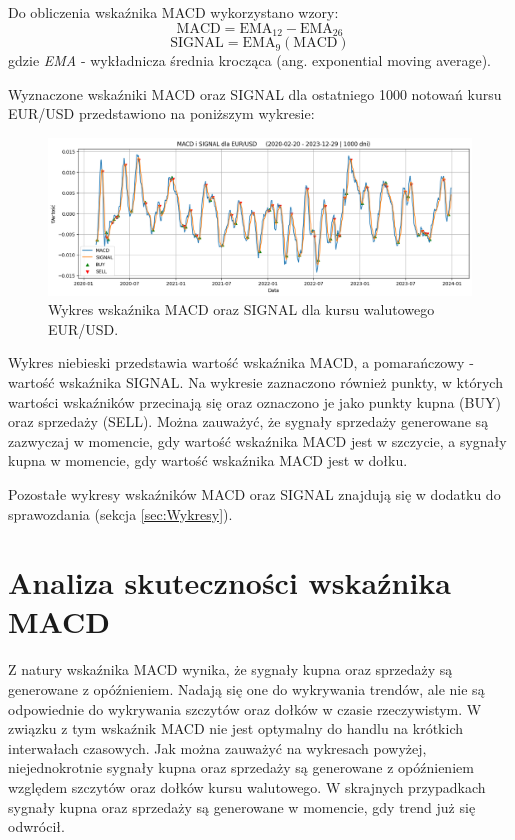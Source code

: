 \documentclass[12pt, a4paper]{article}
\begin{document}
Do obliczenia wskaźnika MACD wykorzystano wzory:
\begin{equation}
    \text{MACD} = \text{EMA}_{12} - \text{EMA}_{26}
\end{equation}
\begin{equation}
    \text{SIGNAL} = \text{EMA}_{9}(\text{MACD})
\end{equation}
gdzie \textit{EMA} - wykładnicza średnia krocząca (ang. exponential moving average).

\pagebreak






Wyznaczone wskaźniki MACD oraz SIGNAL dla ostatniego 1000 notowań kursu EUR/USD
przedstawiono na poniższym wykresie:

\begin{figure}[ht]
    \centering
    \includegraphics[width=1.0\textwidth]{eur_usd_macd_signal.png}
    \caption{Wykres wskaźnika MACD oraz SIGNAL dla kursu walutowego EUR/USD.}
    \label{fig:eur_usd_macd_signal}
\end{figure}

Wykres niebieski przedstawia wartość wskaźnika MACD, a pomarańczowy - wartość wskaźnika SIGNAL.
Na wykresie zaznaczono również punkty, w których wartości wskaźników przecinają się oraz
oznaczono je jako punkty kupna (BUY) oraz sprzedaży (SELL).
Można zauważyć, że sygnały sprzedaży generowane są zazwyczaj w momencie, gdy wartość wskaźnika MACD
jest w szczycie, a sygnały kupna w momencie, gdy wartość wskaźnika MACD jest w dołku.

Pozostałe wykresy wskaźników MACD oraz SIGNAL znajdują się w dodatku do sprawozdania (sekcja \ref{sec:Wykresy}).


\section{Analiza skuteczności wskaźnika MACD}

Z natury wskaźnika MACD wynika, że sygnały kupna oraz sprzedaży są generowane z opóźnieniem.
Nadają się one do wykrywania trendów, ale nie są odpowiednie do wykrywania szczytów oraz dołków w czasie rzeczywistym.
W związku z tym wskaźnik MACD nie jest optymalny do handlu na krótkich interwałach czasowych.
Jak można zauważyć na wykresach powyżej, niejednokrotnie sygnały kupna oraz sprzedaży
są generowane z opóźnieniem względem szczytów oraz dołków kursu walutowego. W skrajnych przypadkach
sygnały kupna oraz sprzedaży są generowane w momencie, gdy trend już się odwrócił.
\end{document}
